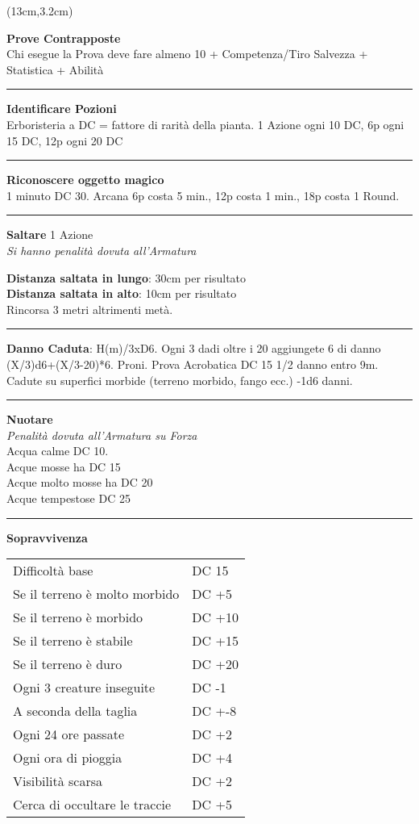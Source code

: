 \documentclass[a4paper,12 pt,openany]{book}
\newcommand{\riga}{\rule{\textwidth}{0.4pt}}
\begin{document}
\begin{textblock*}{7cm}(13cm,3.2cm) %

\textbf{Prove Contrapposte}\\
Chi esegue la Prova deve fare almeno 10 + Competenza/Tiro Salvezza + Statistica + Abilità

\riga

\textbf{Identificare  Pozioni}\\
Erboristeria a DC = fattore di rarità della pianta.  1 Azione ogni 10 DC, 6p ogni 15 DC, 12p ogni 20 DC

\riga

\textbf{Riconoscere oggetto magico}\\
1 minuto DC 30. Arcana 6p costa 5 min., 12p costa 1 min., 18p costa 1 Round.
\riga

\textbf{Saltare} 1 Azione\\
\textit{Si hanno penalità dovuta all'Armatura}

\textbf{Distanza saltata in lungo}: 30cm per risultato\\

\textbf{Distanza saltata in alto}: 10cm per risultato\\

Rincorsa 3 metri altrimenti metà.

\riga

\textbf{Danno Caduta}: H(m)/3xD6. Ogni 3 dadi oltre i 20 aggiungete 6 di danno (X/3)d6+(X/3-20)*6. Proni. Prova Acrobatica DC 15 1/2 danno entro 9m.  Cadute su superfici morbide (terreno morbido, fango ecc.) -1d6 danni.

\riga

\textbf{Nuotare}\\
\textit{Penalità dovuta all'Armatura su Forza}\\
Acqua calme DC 10.\\
Acque mosse ha DC 15\\
Acque molto mosse ha DC 20\\
Acque tempestose DC 25

\riga


\textbf{Sopravvivenza}
\begin{tabular}{ll}
Difficoltà base  & DC 15\\
Se il terreno è molto morbido& DC +5\\
Se il terreno è morbido& DC +10\\
Se il terreno è stabile& DC +15\\
Se il terreno è duro& DC +20\\
Ogni 3 creature inseguite& DC -1\\
A seconda della taglia& DC +-8\\
Ogni 24 ore passate&DC +2\\
Ogni ora di pioggia&DC +4\\
Visibilità scarsa&DC +2\\
Cerca di occultare le traccie&DC +5\\
\end{tabular}\\


\end{textblock*}
\end{document}
